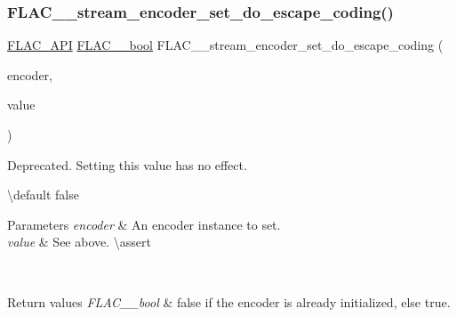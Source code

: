 \subsubsection{\texorpdfstring{FLAC\_\_stream\_encoder\_set\_do\_escape\_coding()}{FLAC\_\_stream\_encoder\_set\_do\_escape\_coding()}}
{\footnotesize\ttfamily \mbox{\hyperlink{group__flac__export_ga56ca07df8a23310707732b1c0007d6f5}{F\+L\+A\+C\+\_\+\+A\+PI}} \mbox{\hyperlink{ordinals_8h_a95103469f1cbd78b8cf250194985b34e}{F\+L\+A\+C\+\_\+\+\_\+bool}} F\+L\+A\+C\+\_\+\+\_\+stream\+\_\+encoder\+\_\+set\+\_\+do\+\_\+escape\+\_\+coding (\begin{DoxyParamCaption}\item[{\mbox{\hyperlink{struct_f_l_a_c_____stream_encoder}{F\+L\+A\+C\+\_\+\+\_\+\+Stream\+Encoder}} $\ast$}]{encoder,  }\item[{\mbox{\hyperlink{ordinals_8h_a95103469f1cbd78b8cf250194985b34e}{F\+L\+A\+C\+\_\+\+\_\+bool}}}]{value }\end{DoxyParamCaption})}

Deprecated. Setting this value has no effect.

\textbackslash{}default {\ttfamily false} 
\begin{DoxyParams}{Parameters}
{\em encoder} & An encoder instance to set. \\
\hline
{\em value} & See above. \textbackslash{}assert 
\begin{DoxyCode}{1}
\end{DoxyCode}
 \\
\hline
\end{DoxyParams}

\begin{DoxyRetVals}{Return values}
{\em F\+L\+A\+C\+\_\+\+\_\+bool} & {\ttfamily false} if the encoder is already initialized, else {\ttfamily true}. \\
\hline
\end{DoxyRetVals}
\mbox{\label{group__flac__stream__encoder_ga7fbc05ec9abd249a400fccb9f189e55e}} 
